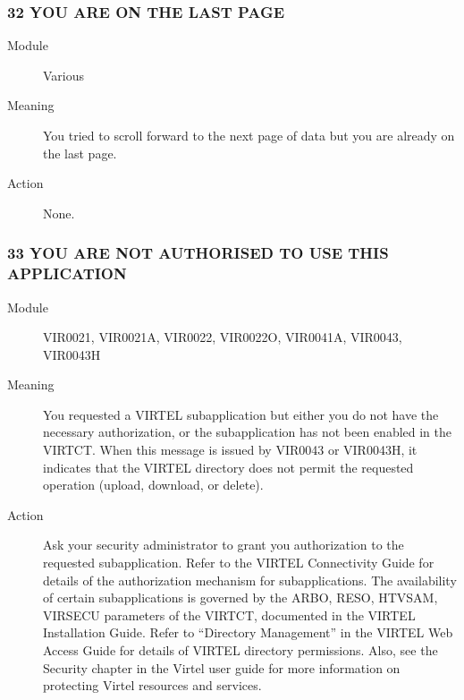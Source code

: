 \documentclass[letterpaper,10pt,english]{sphinxmanual}
\begin{document}
\subsubsection{32 YOU ARE ON THE LAST PAGE}
\label{\detokenize{messages:you-are-on-the-last-page}}\begin{description}
\item[{Module}] \leavevmode
Various

\item[{Meaning}] \leavevmode
You tried to scroll forward to the next page of data but you are already on the last page.

\item[{Action}] \leavevmode
None.

\end{description}


\subsubsection{33 YOU ARE NOT AUTHORISED TO USE THIS APPLICATION}
\label{\detokenize{messages:you-are-not-authorised-to-use-this-application}}\begin{description}
\item[{Module}] \leavevmode
VIR0021, VIR0021A, VIR0022, VIR0022O, VIR0041A, VIR0043, VIR0043H

\item[{Meaning}] \leavevmode
You requested a VIRTEL subapplication but either you do not have the necessary authorization, or the subapplication has not been enabled in the VIRTCT. When this message is issued by VIR0043 or VIR0043H, it indicates that the VIRTEL directory does not permit the requested operation (upload, download, or delete).

\item[{Action}] \leavevmode
Ask your security administrator to grant you authorization to the requested subapplication. Refer to the VIRTEL Connectivity Guide for details of the authorization mechanism for subapplications. The availability of certain subapplications is governed by the ARBO, RESO, HTVSAM, VIRSECU parameters of the VIRTCT, documented in the VIRTEL Installation Guide. Refer to “Directory Management” in the VIRTEL Web Access Guide for details of VIRTEL directory permissions. Also, see the Security chapter in the Virtel user guide for more information on protecting Virtel resources and services.

\end{description}
\end{document}
